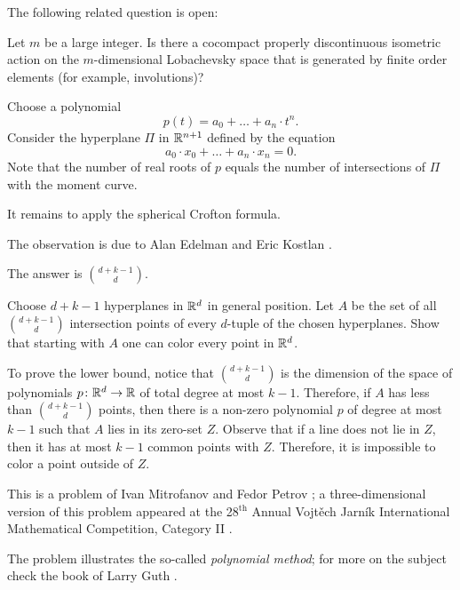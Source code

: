 The following related question is open:

\begin{pr}
Let $m$ be a large integer.
Is there a cocompact properly discontinuous isometric action  on the $m$-dimensional Lobachevsky space that is generated by finite order elements (for example, involutions)?
\end{pr}

Choose a polynomial 
\[p(t)=a_0+\ldots+a_n\cdot t^n.\]
Consider the hyperplane $\Pi$ in $\mathbb{R}^{n+1}$ defined by the equation 
\[a_0\cdot x_0+\ldots+a_n\cdot x_n=0.\]
Note that the number of real roots of $p$ equals the number of intersections of $\Pi$ with the moment curve.

It remains to apply the spherical Crofton formula.
\qeds

The observation is due to Alan Edelman and Eric Kostlan \cite{edelman-kostlan}.


The answer is $\binom{d+k-1}{d}$.

Choose $d+k-1$ hyperplanes in $\mathbb{R}^d$ in general position.
Let $A$ be the set of all $\binom{d+k-1}{d}$ intersection points of every $d$-tuple of the chosen hyperplanes. 
Show that starting with $A$ one can color every point in $\mathbb{R}^d$.

To prove the lower bound, notice that $\binom{d+k-1}{d}$ is the dimension of the space of polynomials $p\colon\mathbb{R}^d\to\mathbb{R}$ of total degree at most $k-1$.
Therefore, if $A$ has less than $\binom{d+k-1}{d}$ points, then there is a non-zero polynomial $p$ of degree at most $k-1$ such that $A$ lies in its zero-set $Z$.
Observe that if a line does not lie in $Z$, then it has at most $k-1$ common points with $Z$.
Therefore, it is impossible to color a point outside of $Z$.
\qeds

This is a problem of Ivan Mitrofanov and Fedor Petrov \cite[№ 10]{kanel-belov};
a three-dimensional version of this problem appeared at the 28$^\text{th}$ Annual Vojtěch Jarník International Mathematical Competition, Category II \cite{vjimc}.

The problem illustrates the so-called \emph{polynomial method};
for more on the subject check the book of Larry Guth \cite{guth2016}.


